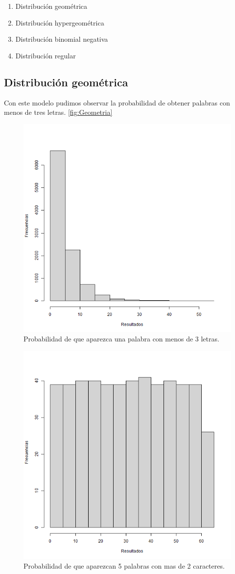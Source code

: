 \documentclass[]{article}
\begin{document}
\begin{enumerate}
	\item Distribución geométrica
	\item Distribución hypergeométrica
	\item Distribución binomial negativa
	\item Distribución regular
\end{enumerate}


\subsection{Distribución geométrica}
Con este modelo pudimos observar la probabilidad de obtener palabras con menos de tres letras. 
\autoref{fig:Geometria}

\begin{figure}[b]
    \centering
    \includegraphics[width=.5\linewidth]{Geometrica.png}    \caption{Probabilidad de que aparezca una palabra con  menos de 3 letras.}
    \label{fig:Geometria}
\end{figure}

\begin{figure}[b]
    \centering
    \includegraphics[width=.5\linewidth]{HyperGeometrica.png}    \caption{Probabilidad de que aparezcan 5 palabras con mas de 2 caracteres.}
    \label{fig:HyperGeometrica}
\end{figure}
\end{document}
